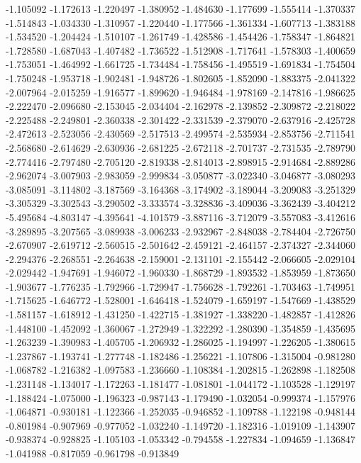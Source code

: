 -1.105092
-1.172613
-1.220497
-1.380952
-1.484630
-1.177699
-1.555414
-1.370337
-1.514843
-1.034330
-1.310957
-1.220440
-1.177566
-1.361334
-1.607713
-1.383188
-1.534520
-1.204424
-1.510107
-1.261749
-1.428586
-1.454426
-1.758347
-1.864821
-1.728580
-1.687043
-1.407482
-1.736522
-1.512908
-1.717641
-1.578303
-1.400659
-1.753051
-1.464992
-1.661725
-1.734484
-1.758456
-1.495519
-1.691834
-1.754504
-1.750248
-1.953718
-1.902481
-1.948726
-1.802605
-1.852090
-1.883375
-2.041322
-2.007964
-2.015259
-1.916577
-1.899620
-1.946484
-1.978169
-2.147816
-1.986625
-2.222470
-2.096680
-2.153045
-2.034404
-2.162978
-2.139852
-2.309872
-2.218022
-2.225488
-2.249801
-2.360338
-2.301422
-2.331539
-2.379070
-2.637916
-2.425728
-2.472613
-2.523056
-2.430569
-2.517513
-2.499574
-2.535934
-2.853756
-2.711541
-2.568680
-2.614629
-2.630936
-2.681225
-2.672118
-2.701737
-2.731535
-2.789790
-2.774416
-2.797480
-2.705120
-2.819338
-2.814013
-2.898915
-2.914684
-2.889286
-2.962074
-3.007903
-2.983059
-2.999834
-3.050877
-3.022340
-3.046877
-3.080293
-3.085091
-3.114802
-3.187569
-3.164368
-3.174902
-3.189044
-3.209083
-3.251329
-3.305329
-3.302543
-3.290502
-3.333574
-3.328836
-3.409036
-3.362439
-3.404212
-5.495684
-4.803147
-4.395641
-4.101579
-3.887116
-3.712079
-3.557083
-3.412616
-3.289895
-3.207565
-3.089938
-3.006233
-2.932967
-2.848038
-2.784404
-2.726750
-2.670907
-2.619712
-2.560515
-2.501642
-2.459121
-2.464157
-2.374327
-2.344060
-2.294376
-2.268551
-2.264638
-2.159001
-2.131101
-2.155442
-2.066605
-2.029104
-2.029442
-1.947691
-1.946072
-1.960330
-1.868729
-1.893532
-1.853959
-1.873650
-1.903677
-1.776235
-1.792966
-1.729947
-1.756628
-1.792261
-1.703463
-1.749951
-1.715625
-1.646772
-1.528001
-1.646418
-1.524079
-1.659197
-1.547669
-1.438529
-1.581157
-1.618912
-1.431250
-1.422715
-1.381927
-1.338220
-1.482857
-1.412826
-1.448100
-1.452092
-1.360067
-1.272949
-1.322292
-1.280390
-1.354859
-1.435695
-1.263239
-1.390983
-1.405705
-1.206932
-1.286025
-1.194997
-1.226205
-1.380615
-1.237867
-1.193741
-1.277748
-1.182486
-1.256221
-1.107806
-1.315004
-0.981280
-1.068782
-1.216382
-1.097583
-1.236660
-1.108384
-1.202815
-1.262898
-1.182508
-1.231148
-1.134017
-1.172263
-1.181477
-1.081801
-1.044172
-1.103528
-1.129197
-1.188424
-1.075000
-1.196323
-0.987143
-1.179490
-1.032054
-0.999374
-1.157976
-1.064871
-0.930181
-1.122366
-1.252035
-0.946852
-1.109788
-1.122198
-0.948144
-0.801984
-0.907969
-0.977052
-1.032240
-1.149720
-1.182316
-1.019109
-1.143907
-0.938374
-0.928825
-1.105103
-1.053342
-0.794558
-1.227834
-1.094659
-1.136847
-1.041988
-0.817059
-0.961798
-0.913849
